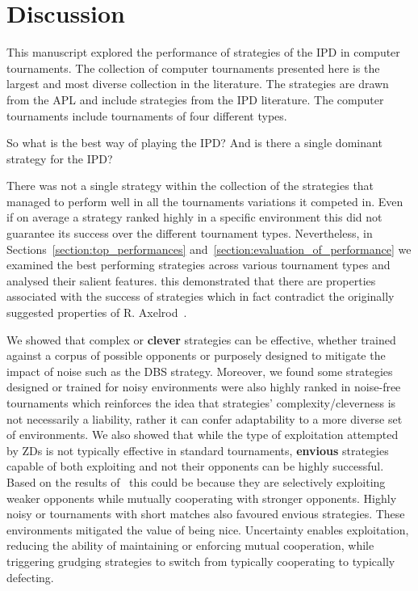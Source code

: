 \documentclass{article}
\newcommand{\numberofalltournaments}{}
\newcommand{\numberofstrategies}{}
\begin{document}
\section{Discussion}\label{section:conclusion}

This manuscript explored the performance of \numberofstrategies strategies of
the IPD in \numberofalltournaments computer tournaments. The collection of
computer tournaments presented here is the largest and most diverse collection in the
literature. The \numberofstrategies strategies are drawn from the APL and include
strategies from the IPD literature. The computer tournaments include tournaments of
four different types.

So what is the best way of playing the IPD? And is
there a single dominant strategy for the IPD? 

There was not a single strategy
within the collection of the \numberofstrategies strategies that managed to
perform well in all the tournaments variations it competed in. Even if on
average a strategy ranked highly in a specific environment this did not
guarantee its success over the different tournament types. Nevertheless, in
Sections~\ref{section:top_performances}
and~\ref{section:evaluation_of_performance} we examined the best performing
strategies across various tournament types and analysed their salient features.
this demonstrated that there are properties associated with the success of
strategies which in fact contradict the originally suggested properties of R.
Axelrod~\cite{Axelrod1981}.

We showed that complex or \textbf{clever} strategies can be effective, whether
trained against a corpus of possible opponents or purposely designed to mitigate
the impact of noise such as the DBS strategy. Moreover, we found some
strategies designed or trained for noisy environments were also highly ranked in
noise-free tournaments which reinforces the idea that strategies'
complexity/cleverness is not necessarily a liability, rather it can confer
adaptability to a more diverse set of environments.
We also showed that while the type of exploitation attempted by ZDs is
not typically effective in standard tournaments, \textbf{envious} strategies
capable of both exploiting and not their opponents can be highly successful.
Based on the results of~\cite{Harper2017} this could be because they are
selectively exploiting weaker opponents while mutually cooperating with stronger
opponents. Highly noisy or tournaments with short matches also favoured envious
strategies. These environments mitigated the value of being nice. Uncertainty
enables exploitation, reducing the ability of maintaining or enforcing mutual
cooperation, while triggering grudging strategies to switch from typically
cooperating to typically defecting.
\end{document}
